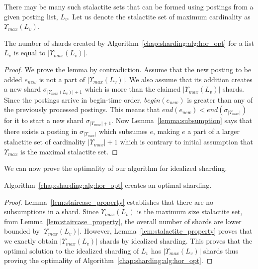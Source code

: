 There may be many such stalactite sets that can be formed using postings from a given posting list, $L_{v}$. Let us denote the stalactite set of maximum cardinality as $\Upsilon_{max}(L_{v})$.

\begin{lemma}
	\label{lem:stalactite_property}
			The number of shards created by Algorithm~\ref{chap:sharding:alg:hor_opt} for a list $L_v$ is equal to $|\Upsilon_{max}(L_v)|$.
\end{lemma}

\begin{proof}{} We prove the lemma by contradiction. Assume that the new posting to be added $e_{new}$ is not a part of $|\Upsilon_{max}(L_v)|$. We also assume that its addition creates a new shard $\sigma_{|\Upsilon_{max}(L_v)|+1}$ which is more than the claimed $|\Upsilon_{max}(L_v)|$ shards. Since the postings arrive in begin-time order, $begin(e_{new})$ is greater than any of the previously processed postings. This means that $end(e_{new}) < end(\sigma_{|\Upsilon_{max}|})$ for it to start a new shard $\sigma_{|\Upsilon_{max}|+1}$. Now Lemma~\ref{lemma:subsumption} says that there exists a posting in $\sigma_{|\Upsilon_{max}|}$ which subsumes $e$, making $e$ a part of a larger stalactite set of cardinality $|\Upsilon_{max}|+1$ which is contrary to initial assumption that $\Upsilon_{max}$ is the maximal stalactite set.
\end{proof}

We can now prove the optimality of our algorithm for idealized sharding.
 \label{hor_opt-thm}
\begin{theorem}
  Algorithm~\ref{chap:sharding:alg:hor_opt} creates an optimal sharding.
\end{theorem}

\begin{proof}{}
	Lemma~\ref{lem:staircase_property} establishes that there are no subsumptions in a shard. Since $\Upsilon_{max}(L_v)$ is the maximum size stalactite set, from Lemma~\ref{lem:staircase_property}, the overall number of shards are lower bounded by $|\Upsilon_{max}(L_v)|$. However, Lemma~\ref{lem:stalactite_property} proves that we exactly obtain $|\Upsilon_{max}(L_v)|$ shards by idealized sharding. This proves that the optimal solution to the idealized sharding of $L_v$ has $|\Upsilon_{max}(L_v)|$ shards thus proving the optimality of Algorithm~\ref{chap:sharding:alg:hor_opt}.
\end{proof}

